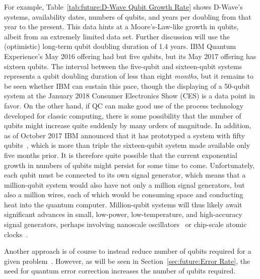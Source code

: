 For example, Table~\ref{tab:future:D-Wave Qubit Growth Rate} shows D-Wave's systems,
availability dates, numbers of qubits, and years per doubling
from that year to the present.
This data hints at a Moore's-Law-like growth in qubits, albeit from
an extremely limited data set.
Further discussion will use the (optimistic) long-term qubit
doubling duration of 1.4 years.
IBM Quantum Experience's May 2016 offering had but five qubits, but its
May 2017 offering has sixteen qubits.
The interval between the five-qubit and sixteen-qubit systems represents
a qubit doubling duration of less than eight \emph{months},
but it remains to be seen whether IBM can sustain this pace,
though the displaying of a 50-qubit system at the January 2018
Consumer Electronics Show (CES) is a data point in favor.
On the other hand, if QC can make good use of the process technology
developed for classic computing, there is some possibility that the number
of qubits might increase quite suddenly by many orders of magnitude.
In addition, as of October 2017 IBM announced that it has prototyped
a system with fifty qubits~\cite{WillKnight2017IBM50qubits}, which
is more than triple the sixteen-qubit system made available only five
months prior.
It is therefore quite possible that the current exponential growth
in numbers of qubits might persist for some time to come.
Unfortunately, each qubit must be connected to its own signal generator,
which means that a million-qubit system would also have not only a million
signal generators, but also a million wires, each of which would be
consuming space and conducting heat into the quantum computer.
Million-qubit systems will thus likely await significant advances
in small, low-power, low-temperature, and high-accuracy signal generators,
perhaps involving nanoscale
oscillators~\cite{EricCHannah2007BuckyballAtomicClock,AndriiDegeler2015BuckyballAtomicClock,KyriakosPorfyrakis2017BuckyballAtomicClock}
or chip-scale atomic
clocks~\cite{WikipediaChipScaleAtomicClock}.

Another approach is of course to instead reduce number of qubits required for a
given problem~\cite{SergeyBravyi2017-QC-SimulateFermionicHamiltonians}.
However, as will be seen in Section~\ref{sec:future:Error Rate}, the need for
quantum error correction increases the number of qubits required.

